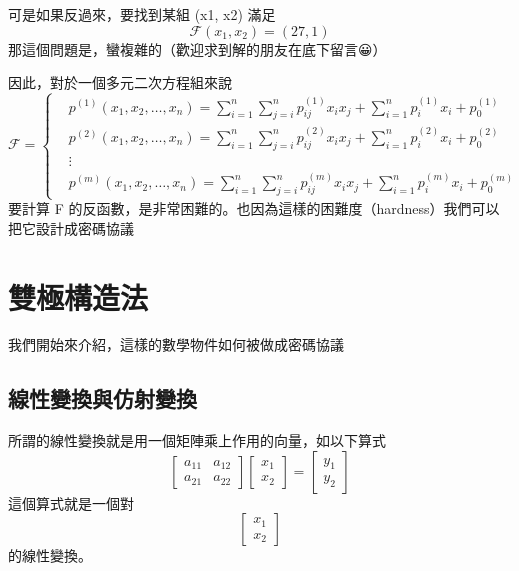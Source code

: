 \documentclass[
]{article}
\begin{document}
可是如果反過來，要找到某組 (x1, x2) 滿足 \[
\mathcal{F}(x_{1},x_{2})=(27,1)
\] 那這個問題是，蠻複雜的（歡迎求到解的朋友在底下留言😀）

因此，對於一個多元二次方程組來說 \[
\mathcal{F = }
\left\{
\begin{aligned}
& p^{(1)}\left(x_1, x_2, \ldots, x_n\right)= \sum_{i=1}^n \sum_{j=i}^n p_{i j}^{(1)} x_i x_j+\sum_{i=1}^n p_i^{(1)} x_i+p_0^{(1)} \\
& p^{(2)}\left(x_1, x_2, \ldots, x_n\right)= \sum_{i=1}^n \sum_{j=i}^n p_{i j}^{(2)} x_i x_j+\sum_{i=1}^n p_i^{(2)} x_i+p_0^{(2)} \\
& \vdots \\
& p^{(m)}\left(x_1, x_2, \ldots, x_n\right)=\sum_{i=1}^n \sum_{j=i}^n p_{i j}^{(m)} x_i x_j+\sum_{i=1}^n p_i^{(m)} x_i+p_0^{(m)}
\end{aligned}\right.
\] 要計算 F
的反函數，是非常困難的。也因為這樣的困難度（hardness）我們可以把它設計成密碼協議

\hypertarget{ux96d9ux6975ux69cbux9020ux6cd5}{%
\section{雙極構造法}\label{ux96d9ux6975ux69cbux9020ux6cd5}}

我們開始來介紹，這樣的數學物件如何被做成密碼協議

\hypertarget{ux7ddaux6027ux8b8aux63dbux8207ux4effux5c04ux8b8aux63db}{%
\subsection{線性變換與仿射變換}\label{ux7ddaux6027ux8b8aux63dbux8207ux4effux5c04ux8b8aux63db}}

所謂的線性變換就是用一個矩陣乘上作用的向量，如以下算式 \[
\begin{bmatrix}
a_{11} & a_{12} \\
a_{21} & a_{22}
\end{bmatrix}\begin{bmatrix}
x_{1}\\x_{2}
\end{bmatrix} = \begin{bmatrix}
y_{1} \\
y_{2}
\end{bmatrix}
\] 這個算式就是一個對 \[
\begin{bmatrix}
x_{1} \\
x_{2}
\end{bmatrix}
\] 的線性變換。
\end{document}
